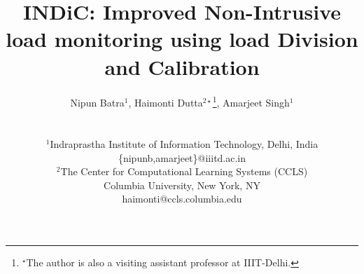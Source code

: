 \documentclass[conference]{IEEEtran}
\newcommand{\indicns}{INDiC}
\begin{document}
%
\title{\indicns: Improved Non-Intrusive load monitoring using load Division and Calibration \vspace{-12.5mm}}

\author{%
{Nipun Batra$^1$, Haimonti Dutta$^{2\star}$\thanks{$^\star$The author is also a visiting assistant professor at IIIT-Delhi.}, Amarjeet Singh$^1$}%
\vspace{-10pt}\\
\fontsize{9}{9}


\\
$^1$Indraprastha Institute of Information Technology, Delhi, India\\
\{nipunb,amarjeet\}@iiitd.ac.in\\
$^2$The Center for Computational Learning Systems (CCLS)\\
Columbia University, New York, NY \\
haimonti@ccls.columbia.edu\\


\vspace{-4mm}
}
\maketitle
\end{document}
